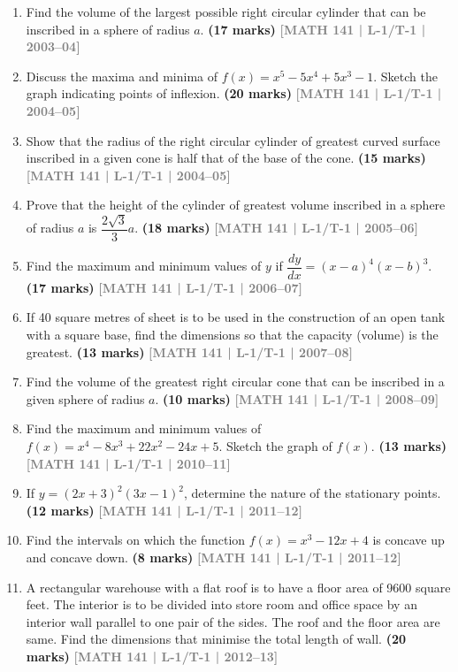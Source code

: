 \documentclass[12pt,a4paper]{article}
\newcommand{\yr}[1]{\hfill\textcolor{gray}{\small\textbf{[#1]}}}
\newcommand{\mk}[1]{\textcolor{orange!70!black}{\small\textbf{(#1 marks)}}}
\begin{document}
\begin{enumerate}

\item Find the volume of the largest possible right circular cylinder that can be inscribed in a sphere of radius $a$.
\mk{17} \yr{MATH 141 | L-1/T-1 | 2003--04}

\item Discuss the maxima and minima of $f(x)=x^{5}-5x^{4}+5x^{3}-1$. Sketch the graph indicating points of inflexion.
\mk{20} \yr{MATH 141 | L-1/T-1 | 2004--05}

\item Show that the radius of the right circular cylinder of greatest curved surface inscribed in a given cone is half that of the base of the cone.
\mk{15} \yr{MATH 141 | L-1/T-1 | 2004--05}

\item Prove that the height of the cylinder of greatest volume inscribed in a sphere of radius $a$ is $\dfrac{2\sqrt{3}}{3}a$.
\mk{18} \yr{MATH 141 | L-1/T-1 | 2005--06}

\item Find the maximum and minimum values of $y$ if $\dfrac{dy}{dx}=(x-a)^{4}(x-b)^{3}$.
\mk{17} \yr{MATH 141 | L-1/T-1 | 2006--07}

\item If 40 square metres of sheet is to be used in the construction of an open tank with a square base, find the dimensions so that the capacity (volume) is the greatest.
\mk{13} \yr{MATH 141 | L-1/T-1 | 2007--08}

\item Find the volume of the greatest right circular cone that can be inscribed in a given sphere of radius $a$.
\mk{10} \yr{MATH 141 | L-1/T-1 | 2008--09}

\item Find the maximum and minimum values of $f(x)=x^{4}-8x^{3}+22x^{2}-24x+5$. Sketch the graph of $f(x)$.
\mk{13} \yr{MATH 141 | L-1/T-1 | 2010--11}

\item If $y=(2x+3)^{2}(3x-1)^{2}$, determine the nature of the stationary points.
\mk{12} \yr{MATH 141 | L-1/T-1 | 2011--12}

\item Find the intervals on which the function $f(x)=x^{3}-12x+4$ is concave up and concave down.
\mk{8} \yr{MATH 141 | L-1/T-1 | 2011--12}

\item A rectangular warehouse with a flat roof is to have a floor area of 9600 square feet. The interior is to be divided into store room and office space by an interior wall parallel to one pair of the sides. The roof and the floor area are same. Find the dimensions that minimise the total length of wall.
\mk{20} \yr{MATH 141 | L-1/T-1 | 2012--13}


\end{enumerate}
\end{document}
